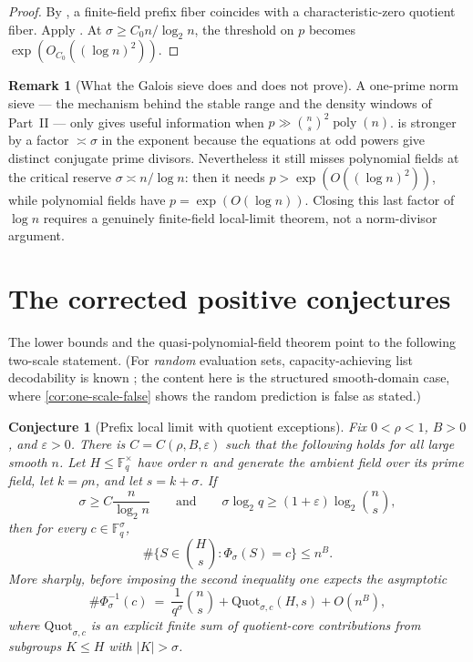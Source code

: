 \documentclass[11pt]{article}
\newtheorem{conjecture}[conjecture]{Conjecture}
\theoremstyle{definition}
\newtheorem{remark}[remark]{Remark}
\newcommand{\F}{\mathbb F}
\newcommand{\eps}{\varepsilon}
\begin{document}
\begin{proof}
By , a finite-field prefix fiber coincides with a characteristic-zero quotient fiber.  Apply .  At $\sigma\ge C_0n/\log_2n$, the threshold on $p$ becomes $\exp(O_{C_0}((\log n)^2))$.
\end{proof}

\begin{remark}[What the Galois sieve does and does not prove]\label{rem:galois-limit}
A one-prime norm sieve --- the mechanism behind the stable range and the density windows of Part~II --- only gives useful information when $p\gg\binom ns^2\operatorname{poly}(n)$.   is stronger by a factor $\asymp\sigma$ in the exponent because the equations at odd powers give distinct conjugate prime divisors.  Nevertheless it still misses polynomial fields at the critical reserve $\sigma\asymp n/\log n$: then it needs $p>\exp(O((\log n)^2))$, while polynomial fields have $p=\exp(O(\log n))$.  Closing this last factor of $\log n$ requires a genuinely finite-field local-limit theorem, not a norm-divisor argument.
\end{remark}

\section{The corrected positive conjectures}\label{sec:conjectures}

The lower bounds and the quasi-polynomial-field theorem point to the following two-scale statement.  (For \emph{random} evaluation sets, capacity-achieving list decodability is known \cite{BGM23,GZ23}; the content here is the structured smooth-domain case, where \cref{cor:one-scale-false} shows the random prediction is false as stated.)

\begin{conjecture}[Prefix local limit with quotient exceptions]\label{conj:prefix-local}
Fix $0<\rho<1$, $B>0$, and $\eps>0$.  There is $C=C(\rho,B,\eps)$ such that the following holds for all large smooth $n$.  Let $H\le\F_q^\times$ have order $n$ and generate the ambient field over its prime field, let $k=\rho n$, and let $s=k+\sigma$.  If
\[
        \sigma\ge C\frac{n}{\log_2n}
        \qquad\text{and}\qquad
        \sigma\log_2q\ge (1+\eps)\log_2\binom ns,
\]
then for every $c\in\F_q^\sigma$,
\[
        \#\{S\in\binom Hs:\Phi_\sigma(S)=c\}\le n^B.
\]
More sharply, before imposing the second inequality one expects the asymptotic
\[
        \#\Phi_\sigma^{-1}(c)
        \ =\ \frac1{q^\sigma}\binom ns
              +\mathrm{Quot}_{\sigma,c}(H,s)
              +O(n^B),
\]
where $\mathrm{Quot}_{\sigma,c}$ is an explicit finite sum of quotient-core contributions from subgroups $K\le H$ with $|K|>\sigma$.
\end{conjecture}
\end{document}
